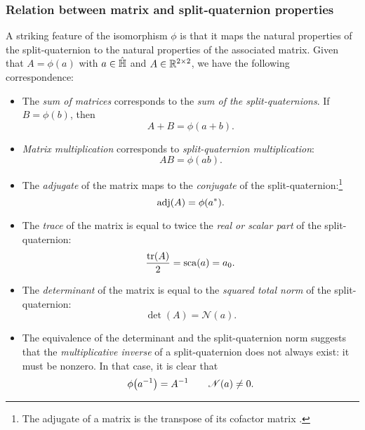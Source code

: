 \subsubsection{Relation between matrix and split-quaternion properties} 
A striking feature of the isomorphism \(\phi\) is that it maps the natural properties of the split-quaternion to the natural properties of the associated matrix. Given that \(A = \phi(a)\) with \(a \in \hat{\mathbb{H}}\) and \(A \in \mathbb{R}^{2\times2}\), we have the following correspondence: 
\begin{itemize}
    \item The \emph{sum of matrices} corresponds to the \emph{sum of the split-quaternions}. If \(B = \phi(b)\), then
        \begin{equation}
            A + B = \phi(a + b).
        \end{equation}
    \item \emph{Matrix multiplication} corresponds to \emph{split-quaternion multiplication}:
        \begin{equation}
              AB = \phi(ab).
        \end{equation}
    \item The \emph{adjugate} of the matrix maps to the \emph{conjugate} of the split-quaternion:\footnote
        {The adjugate of a matrix is the transpose of its cofactor matrix \cite{Verhaegen2007}.}
        \begin{equation}
             \operatorname{adj}(A) = \phi(a^*).
        \end{equation}
    \item The \emph{trace} of the matrix is equal to twice the \emph{real or scalar part} of the split-quaternion:
        \begin{equation}
             \frac{\trace(A)}{2} = \scapart{a} = a_0.
        \end{equation}
    \item The \emph{determinant} of the matrix is equal to the \emph{squared total norm} of the split-quaternion:
        \begin{equation}
              \det(A) = \mathscr{N}(a).
        \end{equation}
    \item The equivalence of the determinant and the split-quaternion norm suggests that the \emph{multiplicative inverse} of a split-quaternion does not always exist: it must be nonzero. In that case, it is clear that
        \begin{equation}
             \phi\qty(a^{-1}) = A^{-1} \qquad \mathscr{N}(a) \neq 0.

\end{equation}
\end{itemize}
